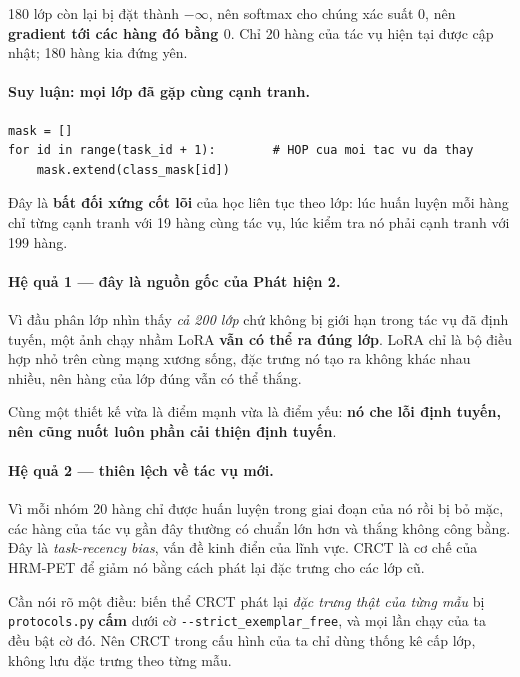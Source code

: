 \documentclass[11pt,a4paper]{article}
\begin{document}
180 lớp còn lại bị đặt thành $-\infty$, nên softmax cho chúng xác suất $0$, nên
\textbf{gradient tới các hàng đó bằng $0$}. Chỉ 20 hàng của tác vụ hiện tại được
cập nhật; 180 hàng kia đứng yên.

\paragraph{Suy luận: mọi lớp đã gặp cùng cạnh tranh.}
\begin{footnotesize}
\begin{verbatim}
mask = []
for id in range(task_id + 1):        # HOP cua moi tac vu da thay
    mask.extend(class_mask[id])
\end{verbatim}
\end{footnotesize}

Đây là \textbf{bất đối xứng cốt lõi} của học liên tục theo lớp: lúc huấn luyện
mỗi hàng chỉ từng cạnh tranh với 19 hàng cùng tác vụ, lúc kiểm tra nó phải cạnh
tranh với 199 hàng.

\paragraph{Hệ quả 1 --- đây là nguồn gốc của Phát hiện 2.}
Vì đầu phân lớp nhìn thấy \emph{cả 200 lớp} chứ không bị giới hạn trong tác vụ đã
định tuyến, một ảnh chạy nhầm LoRA \textbf{vẫn có thể ra đúng lớp}. LoRA chỉ là
bộ điều hợp nhỏ trên cùng mạng xương sống, đặc trưng nó tạo ra không khác nhau
nhiều, nên hàng của lớp đúng vẫn có thể thắng.

Cùng một thiết kế vừa là điểm mạnh vừa là điểm yếu: \textbf{nó che lỗi định
tuyến, nên cũng nuốt luôn phần cải thiện định tuyến}.

\paragraph{Hệ quả 2 --- thiên lệch về tác vụ mới.}
Vì mỗi nhóm 20 hàng chỉ được huấn luyện trong giai đoạn của nó rồi bị bỏ mặc, các
hàng của tác vụ gần đây thường có chuẩn lớn hơn và thắng không công bằng. Đây là
\emph{task-recency bias}, vấn đề kinh điển của lĩnh vực. CRCT là cơ chế của
HRM-PET để giảm nó bằng cách phát lại đặc trưng cho các lớp cũ.

Cần nói rõ một điều: biến thể CRCT phát lại \emph{đặc trưng thật của từng mẫu} bị
\texttt{protocols.py} \textbf{cấm} dưới cờ \texttt{-{}-strict\_exemplar\_free},
và mọi lần chạy của ta đều bật cờ đó. Nên CRCT trong cấu hình của ta chỉ dùng
thống kê cấp lớp, không lưu đặc trưng theo từng mẫu.
\end{document}
